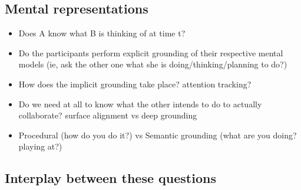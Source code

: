 \documentclass[a4paper]{article}
\begin{document}
\subsection{Mental representations}

\begin{itemize}
    \item Does A know what B is thinking of at time t?
    \item Do the participants perform explicit grounding of their respective mental models
        (ie, ask the other one what she is doing/thinking/planning to do?)
    \item How does the implicit grounding take place? attention tracking?
    \item Do we need at all to know what the other intends to do to actually
        collaborate? surface alignment vs deep grounding
    \item Procedural (how do you do it?) vs Semantic
        grounding (what are you doing? playing at?)
\end{itemize}

\subsection{Interplay between these questions}
\end{document}

